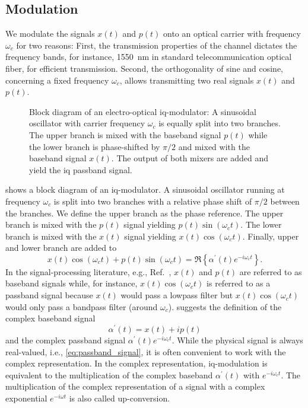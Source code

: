 \FloatBarrier
\subsection{Modulation}

We modulate the signals $x(t)$ and $p(t)$ onto an optical carrier with frequency $\omega_c$ for two reasons:
First, the transmission properties of the channel dictates the frequency bands, for instance, \SI{1550}{\nano\meter} in standard telecommunication optical fiber, for efficient transmission.
Second, the orthogonality of sine and cosine, concerning a fixed frequency $\omega_c$, allows transmitting two real signals $x(t)$ and $p(t)$.
\begin{figure}[htb]
	\centering
	
	\caption{Block diagram of an electro-optical \gls{iq}-modulator: A sinusoidal oscillator with carrier frequency $\omega_c$ is equally split into two branches. The upper branch is mixed with the baseband signal $p(t)$ while the lower branch is phase-shifted by $\pi/2$ and mixed with the baseband signal $x(t)$. The output of both mixers are added and yield the \gls{iq} passband signal.}\label{fig:iqmod}
\end{figure}
 shows a block diagram of an \gls{iq}-modulator.
A sinusoidal oscillator running at frequency $\omega_c$ is split into two branches with a relative phase shift of $\pi/2$ between the branches.
We define the upper branch as the phase reference.
The upper branch is mixed with the $p(t)$ signal yielding $p(t)\sin(\omega_ct)$.
The lower branch is mixed with the $x(t)$ signal yielding $x(t)\cos(\omega_ct)$.
Finally, upper and lower branch are added to
\begin{equation}
	x(t)
	\cos(\omega_ct)
	+
	p(t)
	\sin(\omega_ct)
	=
	\Re\left\{
		\alpha^\prime(t)
		e^{-i\omega_ct}
	\right\}
	\label{eq:passband_signal}.
\end{equation}
In the signal-processing literature, e.g., Ref.~\cite[p.~25]{Madhow2008}, $x(t)$ and $p(t)$ are referred to as baseband signals while, for instance, $x(t)\cos(\omega_ct)$ is referred to as a passband signal because $x(t)$ would pass a lowpass filter but $x(t)\cos(\omega_ct)$ would only pass a bandpass filter (around $\omega_c$).
 suggests the definition of the complex baseband signal
\begin{equation}
	\alpha^\prime(t)
	=
	x(t)
	+
	ip(t)
\end{equation}
and the complex passband signal $\alpha^\prime(t)e^{-i\omega_ct}$.
While the physical signal is always real-valued, i.e., \cref{eq:passband_signal}, it is often convenient to work with the complex representation.
In the complex representation, \gls{iq}-modulation is equivalent to the multiplication of the complex baseband $\alpha^\prime(t)$ with $e^{-i\omega_ct}$.
The multiplication of the complex representation of a signal with a complex exponential $e^{-i\omega t}$ is also called up-conversion.


